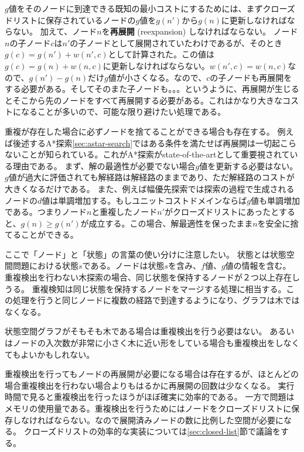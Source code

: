 \documentclass[10pt]{book}
\newcommand{\define}[2]{{\bf #1} (#2) \index{#1}\index{#2}}
\begin{document}
$g$値をそのノードに到達できる既知の最小コストにするためには、まずクローズドリストに保存されているノードの$g$値を$g(n')$から$g(n)$に更新しなければならない。
加えて、ノード$n$を\define{再展開}{reexpansion}しなければならない。
ノード$n$の子ノード$c$は$n'$の子ノードとして展開されていたわけであるが、そのとき$g(c) = g(n') + w(n', c)$として計算された。この値は$g(c) = g(n) + w(n, c)$に更新しなければならない。$w(n', c) = w(n, c)$なので、$g(n') - g(n)$だけ$g$値が小さくなる。なので、$c$の子ノードも再展開をする必要がある。そしてそのまた子ノードも。。。というように、再展開が生じるとそこから先のノードをすべて再展開する必要がある。これはかなり大きなコストになることが多いので、可能な限り避けたい処理である。


重複が存在した場合に必ずノードを捨てることができる場合も存在する。
例えば後述するA*探索\ref{sec:astar-search}ではある条件を満たせば再展開は一切起こらないことが知られている。これがA*探索がstate-of-the-artとして重要視されている理由である。
まず、解の最適性が必要でない場合$g$値を更新する必要はない。$g$値が過大に評価されても解経路は解経路のままであり、ただ解経路のコストが大きくなるだけである。
また、例えば幅優先探索では探索の過程で生成されるノードの$d$値は単調増加する。もしユニットコストドメインならば$g$値も単調増加である。つまりノード$n$と重複したノード$n'$がクローズドリストにあったとすると、$g(n) \geq g(n')$が成立する。この場合、解最適性を保ったまま$n$を安全に捨てることができる。

ここで「ノード」と「状態」の言葉の使い分けに注意したい。
状態とは状態空間問題における状態$s$である。ノードは状態$s$を含み、$f$値、$g$値の情報を含む。
重複検出を行わない木探索の場合、同じ状態を保持するノードが２つ以上存在しうる。
重複検知は同じ状態を保持するノードをマージする処理に相当する。この処理を行うと同じノードに複数の経路で到達するようになり、グラフは木ではなくなる。

状態空間グラフがそもそも木である場合は重複検出を行う必要はない。
あるいはノードの入次数が非常に小さく木に近い形をしている場合も重複検出をしなくてもよいかもしれない。

重複検出を行ってもノードの再展開が必要になる場合は存在するが、ほとんどの場合重複検出を行わない場合よりもはるかに再展開の回数は少なくなる。
実行時間で見ると重複検出を行ったほうがほぼ確実に効率的である。
一方で問題はメモリの使用量である。重複検出を行うためにはノードをクローズドリストに保存しなければならない。なので展開済みノードの数に比例した空間が必要になる。
クローズドリストの効率的な実装については\ref{sec:closed-list}節で議論をする。
\end{document}
